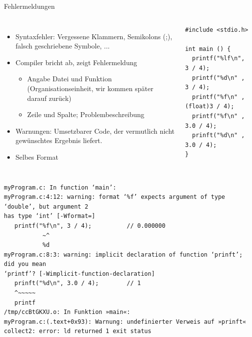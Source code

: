 \begin{frame}[fragile]{Fehlermeldungen}
%
\begin{columns}[T]
\begin{itemize}
\item Syntaxfehler: Vergessene Klammern, Semikolons (;), falsch geschriebene Symbole, ...
\item Compiler bricht ab, zeigt Fehlermeldung
	\begin{itemize}
	\item Angabe Datei und Funktion (Organisationseinheit, wir kommen später darauf zurück)
	\item Zeile und Spalte; Problembeschreibung
	\end{itemize}
\item Warnungen: Umsetzbarer Code, der vermutlich nicht gewünschtes Ergebnis liefert.
\item Selbes Format
\end{itemize}
%
\begin{codebox}
\begin{verbatim}
#include <stdio.h>

int main () {
  printf("%lf\n", 3 / 4);
  printf("%d\n" , 3 / 4);
  printf("%f\n" , (float)3 / 4);
  printf("%f\n" , 3.0 / 4);
  prinft("%d\n" , 3.0 / 4);
}
\end{verbatim}
\end{codebox}
\end{columns}
%
\end{frame}


\begin{frame}[fragile]
%
\begin{cmdbox}
\begin{verbatim}
myProgram.c: In function ‘main’:
myProgram.c:4:12: warning: format ‘%f’ expects argument of type ‘double’, but argument 2 
has type ‘int’ [-Wformat=]
   printf("%f\n", 3 / 4);          // 0.000000
           ~^
           %d
myProgram.c:8:3: warning: implicit declaration of function ‘prinft’; did you mean 
‘printf’? [-Wimplicit-function-declaration]
   prinft("%d\n", 3.0 / 4);        // 1
   ^~~~~~
   printf
/tmp/ccBtGKXU.o: In Funktion »main«:
myProgram.c:(.text+0x93): Warnung: undefinierter Verweis auf »prinft«
collect2: error: ld returned 1 exit status
\end{verbatim}
\end{cmdbox}
%
\end{frame}